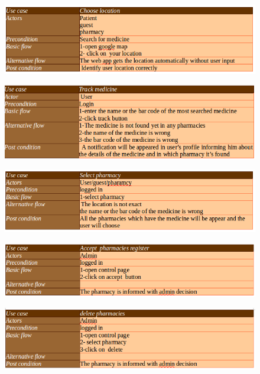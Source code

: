 \documentclass[]{article}
\begin{document}
\begin{figure}[H]
\centering
\includegraphics[scale=0.4]{./scenario/06}
\end{figure}
\begin{figure}[H]
\centering
\includegraphics[scale=0.4]{./scenario/07}
\end{figure}
\begin{figure}[H]
\centering
\includegraphics[scale=0.4]{./scenario/08}
\end{figure}
\begin{figure}[H]
\centering
\includegraphics[scale=0.4]{./scenario/09}
\end{figure}
\begin{figure}[H]
\centering
\includegraphics[scale=0.4]{./scenario/10}
\end{figure}
\end{document}
